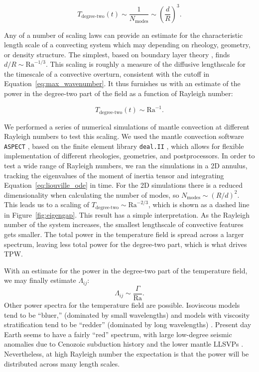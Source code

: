 \documentclass[preprint,12pt,authoryear]{elsarticle}
\begin{document}
\begin{equation}
T_{\text{degree-two}}(t) \sim \frac{1}{N_{\text{modes}}} \sim \left( \frac{d}{R}\right)^3.
\end{equation}

Any of a number of scaling laws can provide an estimate for the characteristic length scale of a convecting system which may depending on rheology, geometry, or density structure.
The simplest, based on boundary layer theory \citep{turcotte1967finite}, finds $d/R \sim \mathrm{Ra}^{-1/3}$.
This scaling is roughly a measure of the diffusive lengthscale for the timescale of a convective overturn, consistent
with the cutoff in Equation~\eqref{eq:max_wavenumber}.
It thus furnishes us with an estimate of the power in 
the degree-two part of the field as a function of Rayleigh number:

\begin{equation}
T_{\text{degree-two}}(t) \sim \mathrm{Ra}^{-1}.
\label{eq:degree_two_of_ra}
\end{equation}

We performed a series of numerical simulations of mantle convection at different Rayleigh numbers to test this scaling.
We used the mantle convection software \texttt{ASPECT} \citep{kronbichler2012high}, based on the finite element library \texttt{deal.II} \citep{dealII82},
which allows for flexible implementation of different rheologies, geometries, and postprocessors.
In order to test a wide range of Rayleigh numbers, we ran the simulations in a 2D annulus, tracking the eigenvalues of the 
moment of inertia tensor and integrating Equation~\eqref{eq:liouville_ode} in time.
For the 2D simulations there is a reduced dimensionality when calculating the number of modes,
so $N_\text{modes} \sim \left(R/d \right)^2$.  This leads us to a scaling of $T_{\text{degree-two}} \sim \mathrm{Ra}^{-2/3}$, 
which is shown as a dashed line in Figure~\ref{fig:eigengap}.
This result has a simple interpretation.
As the Rayleigh number of the system increases, the smallest lengthscale of convective features gets smaller.
The total power in the temperature field is spread across a larger spectrum, leaving less total power for the degree-two part, which is what drives TPW.


With an estimate for the power in the degree-two part of the temperature field, we may finally estimate $\Lambda_{ij}$:
\begin{equation}
\Lambda_{ij} \sim \frac{\Gamma}{\mathrm{Ra} }.
\label{eq:lambda_estimate}
\end{equation}
Other power spectra for the temperature field are possible. Isoviscous models tend to be ``bluer,'' (dominated by small wavelengths) 
and models with viscosity stratification tend to be ``redder'' (dominated by long wavelengths) \citep{richards1999polar}.
Present day Earth seems to have a fairly ``red'' spectrum, with large low-degree seismic anomalies due to 
Cenozoic subduction history and the lower mantle LLSVPs \citep{dziewonski2010mantle}.
Nevertheless, at high Rayleigh number the expectation is that the power will be distributed across many length scales.
\end{document}
